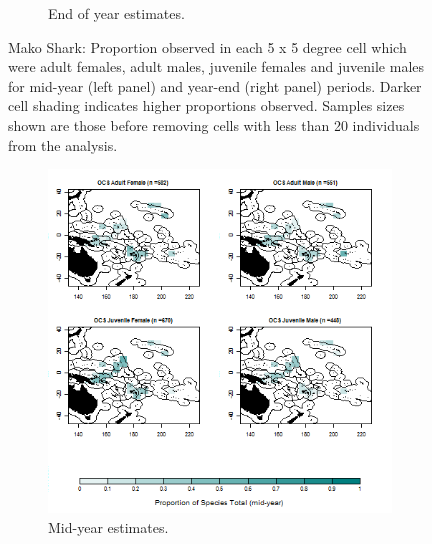 \documentclass[12pt]{SCreport}
\begin{document}
\begin{landscape}
\begin{figure}
\begin{subfigure}[b]{0.6\textwidth}
       \caption{End of year estimates.}
       \label{fig:BI_25}
   \end{subfigure}
\caption{Mako Shark: Proportion observed in each 5 x 5 degree cell which were adult females, adult males, juvenile females and juvenile males for mid-year (left panel) and year-end (right panel) periods. Darker cell shading indicates higher proportions observed. Samples sizes shown are those before removing cells with less than 20 individuals from the analysis. }
\label{BI_M04} 
\end{figure}
\end{landscape}

\begin{landscape}
\begin{figure}
\centering
   \begin{subfigure}[b]{0.6\textwidth}
       \includegraphics[width=\textwidth]{../GRAPHICS/Defined/BI_28_Map_maturity_sex_OCS_MY}
       \caption{Mid-year estimates.}
       \label{fig:BI_28}
   \end{subfigure}
   \begin{subfigure}[b]{0.6\textwidth}

\end{subfigure}
\end{figure}
\end{landscape}
\end{document}
